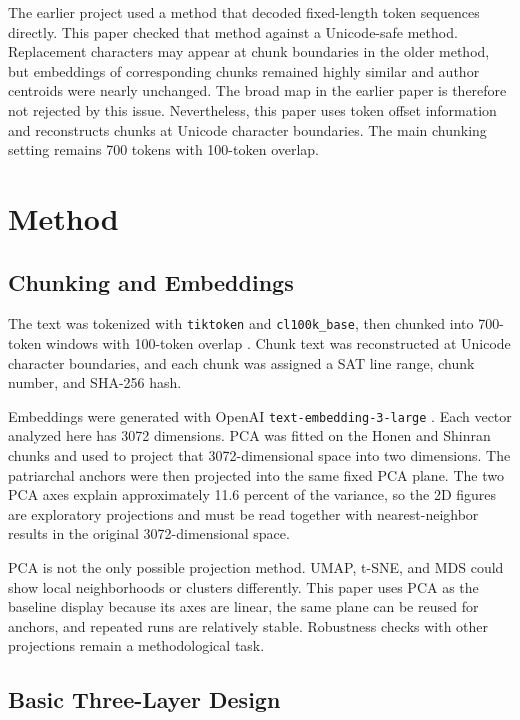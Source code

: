 \documentclass[uplatex,dvipdfmx,11pt,a4paper]{jsarticle}
\begin{document}
The earlier project used a method that decoded fixed-length token sequences directly. This paper checked that method against a Unicode-safe method. Replacement characters may appear at chunk boundaries in the older method, but embeddings of corresponding chunks remained highly similar and author centroids were nearly unchanged. The broad map in the earlier paper is therefore not rejected by this issue. Nevertheless, this paper uses token offset information and reconstructs chunks at Unicode character boundaries. The main chunking setting remains 700 tokens with 100-token overlap.

\section{Method}

\subsection{Chunking and Embeddings}

The text was tokenized with \texttt{tiktoken} and \texttt{cl100k\_base}, then chunked into 700-token windows with 100-token overlap \cite{tiktoken}. Chunk text was reconstructed at Unicode character boundaries, and each chunk was assigned a SAT line range, chunk number, and SHA-256 hash.

Embeddings were generated with OpenAI \texttt{text-embedding-3-large} \cite{openai-embeddings}. Each vector analyzed here has 3072 dimensions. PCA was fitted on the Honen and Shinran chunks and used to project that 3072-dimensional space into two dimensions. The patriarchal anchors were then projected into the same fixed PCA plane. The two PCA axes explain approximately 11.6 percent of the variance, so the 2D figures are exploratory projections and must be read together with nearest-neighbor results in the original 3072-dimensional space.

PCA is not the only possible projection method. UMAP, t-SNE, and MDS could show local neighborhoods or clusters differently. This paper uses PCA as the baseline display because its axes are linear, the same plane can be reused for anchors, and repeated runs are relatively stable. Robustness checks with other projections remain a methodological task.

\subsection{Basic Three-Layer Design}
\end{document}

